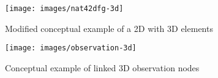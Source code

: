 \begin{figure}[htpb]
	\centering
	\texttt{[image: images/nat42dfg-3d]}
	\caption{Modified conceptual example of a 2D {\dfg} with 3D elements}
	\label{fig:nat42dfg-3d}
\end{figure}

\begin{figure}[htpb]
	\centering
	\texttt{[image: images/observation-3d]}
	\caption{Conceptual example of linked 3D observation nodes}
	\label{fig:observation-3d}
\end{figure}


